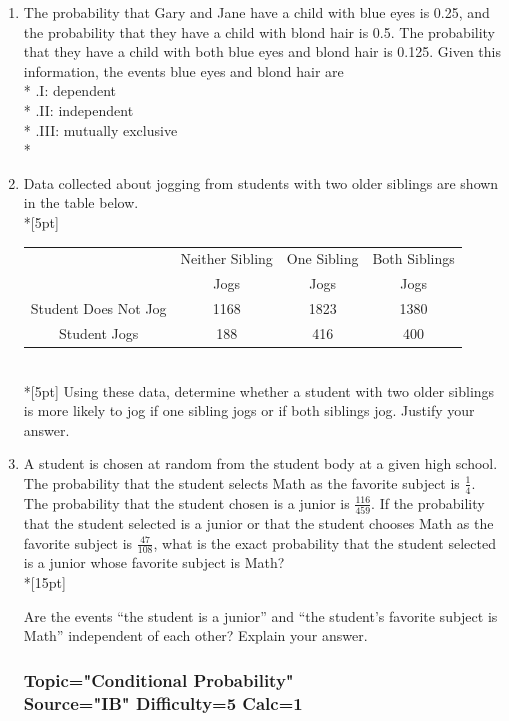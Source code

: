 \documentclass[12pt, oneside]{article}
\begin{document}
\begin{enumerate}
\item The probability that Gary and Jane have a child with blue eyes is 0.25, and the probability that they have a child with blond hair is 0.5. The probability that they have a child with both blue eyes and blond hair is 0.125. Given this information, the events blue eyes and blond hair are\\*
.\qquad I: dependent\\*
.\qquad II: independent\\*
.\qquad III: mutually exclusive\\* %

\item Data collected about jogging from students with two older siblings are shown in the table below.\\*[5pt]
\begin{tabular}{|c|c|c|c|}
\hline 
& Neither Sibling & One Sibling & Both Siblings\\ 
& Jogs & Jogs & Jogs\\\hline 
Student Does Not Jog & 1168 & 1823 & 1380 \\ 
\hline 
Student Jogs & 188 & 416 & 400 \\ 
\hline 
\end{tabular}\\*[5pt]
Using these data, determine whether a student with two older siblings is more likely to jog if one sibling jogs or if both siblings jog. Justify your answer. %

\item A student is chosen at random from the student body at a given high school. The probability that the student selects Math as the favorite subject is $\frac{1}{4}$. The probability that the student chosen is a junior is $\frac{116}{459}$. If the probability that the student selected is a junior or that the student chooses Math as the favorite subject is $\frac{47}{108}$, what is the exact probability that the student selected is a junior whose favorite subject is Math?\\*[15pt]

Are the events ``the student is a junior” and ``the student’s favorite subject is Math” independent of each other? Explain your answer. %

\subsubsection*{Topic="Conditional Probability"\\
Source="IB" 
Difficulty=5 
Calc=1}


\end{enumerate}
\end{document}
